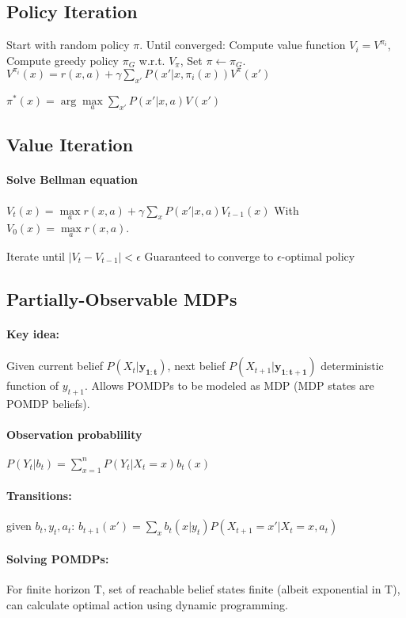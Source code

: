\begin{multicols}{4}
\subsection{Policy Iteration}
Start with random policy $\pi$. Until converged: Compute value function $V_i = V^{\pi_i}$, Compute greedy policy $\pi_G$ w.r.t. $V_{\pi}$, Set $\pi \leftarrow \pi_G$.
$V^{\pi_i}(x) = r(x, a) + \gamma \sum\limits_{x'} P(x'|x,\pi_i(x))V^{\pi}(x')$

$\pi^*(x) = \arg\max\limits_a \sum\limits_{x'} P(x'|x,a)V(x')$
\subsection{Value Iteration}
\paragraph{Solve Bellman equation} $V_t(x) = \max\limits_a r(x,a) + \gamma \sum\limits_{x}P(x'|x,a)V_{t-1}(x)$
With $V_0(x) = \max\limits_a r(x,a)$.

Iterate until $|V_t - V_{t-1}| < \epsilon$
Guaranteed to converge to $\epsilon$-optimal policy

\subsection{Partially-Observable MDPs}
\paragraph{Key idea:} Given current belief $P(X_t|\bm{y_{1:t}})$, next belief $P(X_{t+1}|\bm{y_{1:t+1}})$ deterministic function of $y_{t+1}$. Allows POMDPs to be modeled as MDP (MDP states are POMDP beliefs).
\paragraph{Observation probablility} $P(Y_t|b_t) = \sum\limits_{x=1}^nP(Y_t | X_t = x)b_t(x)$
\paragraph{Transitions:} given $b_t, y_t, a_t$: $b_{t+1}(x') = \sum\limits_x b_t(x|y_t)P(X_{t+1} = x' | X_t = x,a_t)$
\paragraph{Solving POMDPs:} For finite horizon T, set of reachable belief states finite (albeit exponential in T), can calculate optimal action using dynamic programming.

\end{multicols}
